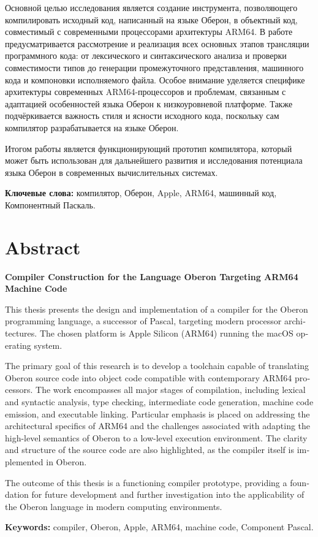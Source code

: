 \documentclass[utf8]{lgu}
\begin{document}
Основной целью исследования является создание инструмента, позволяющего компилировать исходный код, написанный на языке Оберон, в объектный код, совместимый с современными процессорами архитектуры ARM64. В работе предусматривается рассмотрение и реализация всех основных этапов трансляции программного кода: от лексического и синтаксического анализа и проверки совместимости типов до генерации промежуточного представления, машинного кода и компоновки исполняемого файла. Особое внимание уделяется специфике архитектуры современных ARM64-процессоров и проблемам, связанным с адаптацией особенностей языка Оберон к низкоуровневой платформе. Также подчёркивается важность стиля и ясности исходного кода, поскольку сам компилятор разрабатывается на языке Оберон.

Итогом работы является функционирующий прототип компилятора, который может быть использован для дальнейшего развития и исследования потенциала языка Оберон в современных вычислительных системах.

\vspace{0.5cm}
\textbf{Ключевые слова:} компилятор, Оберон, Apple, ARM64, машинный код, Компонентный Паскаль.

\newpage

\section*{Abstract}
\begin{english}
\firstparskip

\textbf{Compiler Construction for the Language Oberon Targeting ARM64 Machine Code}
\vspace{0.5cm}

This thesis presents the design and implementation of a compiler for the Oberon programming language, a successor of Pascal, targeting modern processor architectures. The chosen platform is Apple Silicon (ARM64) running the macOS operating system.

The primary goal of this research is to develop a toolchain capable of translating Oberon source code into object code compatible with contemporary ARM64 processors. The work encompasses all major stages of compilation, including lexical and syntactic analysis, type checking, intermediate code generation, machine code emission, and executable linking. Particular emphasis is placed on addressing the architectural specifics of ARM64 and the challenges associated with adapting the high-level semantics of Oberon to a low-level execution environment. The clarity and structure of the source code are also highlighted, as the compiler itself is implemented in Oberon.

The outcome of this thesis is a functioning compiler prototype, providing a foundation for future development and further investigation into the applicability of the Oberon language in modern computing environments.

\vspace{0.5cm}
\textbf{Keywords:} compiler, Oberon, Apple, ARM64, machine code, Component Pascal.
\end{english}
\end{document}
